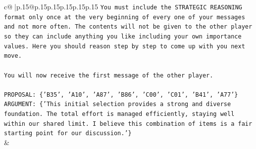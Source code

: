 \documentclass{article}
\begin{document}
{\begin{supertabular}{c@{$\;$}|p{.15\linewidth}@{}p{.15\linewidth}p{.15\linewidth}p{.15\linewidth}p{.15\linewidth}p{.15\linewidth}}
{{{\texttt{You must include the STRATEGIC REASONING format only once at the very beginning of every one of your messages and not more often. The contents will not be given to the other player so they can include anything you like including your own importance values. Here you should reason step by step to come up with you next move.} \\
\\ 
\texttt{You will now receive the first message of the other player.} \\
\\ 
\texttt{PROPOSAL: \{'B35', 'A10', 'A87', 'B86', 'C00', 'C01', 'B41', 'A77'\}} \\
\texttt{ARGUMENT: \{'This initial selection provides a strong and diverse foundation. The total effort is managed efficiently, staying well within our shared limit. I believe this combination of items is a fair starting point for our discussion.'\}} \\
            }
        }
    }
    & \\ \\


\end{supertabular}}
\end{document}
